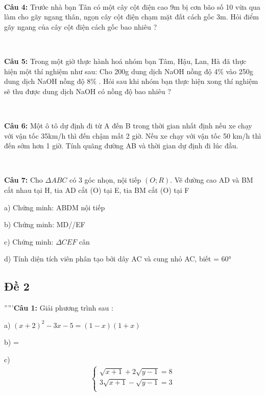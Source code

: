 \documentclass[12pt]{article}
\begin{document}
\

\textbf{Câu 4:} Trước nhà bạn Tân có một cây cột điện cao 9m bị cơn bão số 10 vừa qua làm cho gãy ngang thân, ngọn cây cột điện chạm mặt đất cách gốc 3m. Hỏi điểm gãy ngang của cây cột điện cách gốc bao nhiêu ? \par

\ 

\textbf{Câu 5:} Trong một giờ thực hành hoá nhóm bạn Tâm, Hậu, Lan, Hà đã thực hiện một thí nghiệm như sau: Cho 200g dung dịch NaOH nồng độ 4\% vào 250g dung dịch NaOH nồng độ 8\% . Hỏi sau khi nhóm bạn thực hiện xong thí nghiệm sẽ thu được dung dịch NaOH có nồng độ bao nhiêu ? \par

\ 

\textbf{Câu 6:} Một ô tô dự định đi từ A đến B trong thời gian nhất định nếu xe chạy với vận tốc 35km/h thì đến chậm mất 2 giờ. Nếu xe chạy với vận tốc 50 km/h thì đến sớm hơn 1 giờ. Tính quãng đường AB và thời gian dự định đi lúc đầu. \par

\ 

\textbf{Câu 7:} Cho $\Delta ABC$ có 3 góc nhọn, nội tiếp $(O; R)$. Vẽ đường cao AD và BM cắt nhau tại H, tia AD cắt (O) tại E, tia BM cắt (O) tại F \par
a) Chứng minh: ABDM nội tiếp \par
b) Chứng minh: MD//EF \par
c) Chứng minh: $\Delta CEF$ cân \par
d) Tính diện tích viên phân tạo bởi dây AC và cung nhỏ AC, biết  = \ang{ 60} 

\break

\subsection{Đề 2}

'''''\textbf{Câu 1:} Giải phương trình sau : \par
a) $(x+2)^2 - 3x -5 = (1-x)(1+x)$ \par
b)  =  \par
c) \begin{align}
    \begin{cases}
    \sqrt{x+1} + 2\sqrt{y-1} = 8\\
    3\sqrt{x+1} - \sqrt{y-1} = 3\\
    \end{cases}
\end{align}
\end{document}
